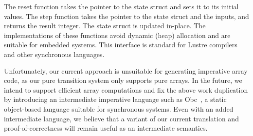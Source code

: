 The reset function takes the pointer to the state struct and sets it to its initial values.
The step function takes the pointer to the state struct and the inputs, and returns the result integer.
The state struct is updated in-place.
The implementations of these functions avoid dynamic (heap) allocation and are suitable for embedded systems.
This interface is standard for Lustre compilers~\cite{bourke2017formally,gerard2012modular} and other synchronous languages.

Unfortunately, our current approach is unsuitable for generating imperative array code, as our pure transition system only supports pure arrays.
In the future, we intend to support efficient array computations and fix the above work duplication by introducing an intermediate imperative language such as Obc~\cite{biernacki2008clock}, a static object-based language suitable for synchronous systems.
Even with an added intermediate language, we believe that a variant of our current translation and proof-of-correctness will remain useful as an intermediate semantics.
